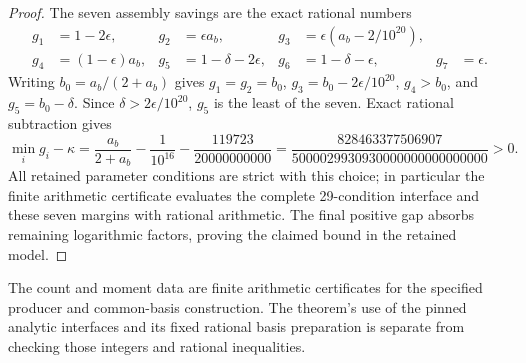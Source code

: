 \begin{proof}
The seven assembly savings are the exact rational numbers
\[
\begin{aligned}
 g_1&=1-2\epsilon,&g_2&=\epsilon a_b,&
 g_3&=\epsilon(a_b-2/10^{20}),\\
 g_4&=(1-\epsilon)a_b,&g_5&=1-\delta-2\epsilon,&
 g_6&=1-\delta-\epsilon,&g_7&=\epsilon.
\end{aligned}
\]
Writing $b_0=a_b/(2+a_b)$ gives $g_1=g_2=b_0$,
$g_3=b_0-2\epsilon/10^{20}$, $g_4>b_0$,
and $g_5=b_0-\delta$. Since $\delta>2\epsilon/10^{20}$,
$g_5$ is the least of the seven. Exact rational subtraction gives
\[
 \min_i g_i-\kappa
 =\frac{a_b}{2+a_b}-\frac1{10^{16}}
       -\frac{119723}{20000000000}
 =\frac{828463377506907}{5000029930930000000000000000}>0.
\]
All retained parameter conditions are strict with this choice; in
particular the finite arithmetic certificate evaluates the complete
29-condition interface and these seven margins with rational arithmetic.
The final positive gap absorbs remaining logarithmic factors, proving
the claimed bound in the retained model.
\end{proof}

The count and moment data are finite arithmetic certificates for the
specified producer and common-basis construction. The theorem's use of
the pinned analytic interfaces and its fixed rational basis preparation
is separate from checking those integers and rational inequalities.
